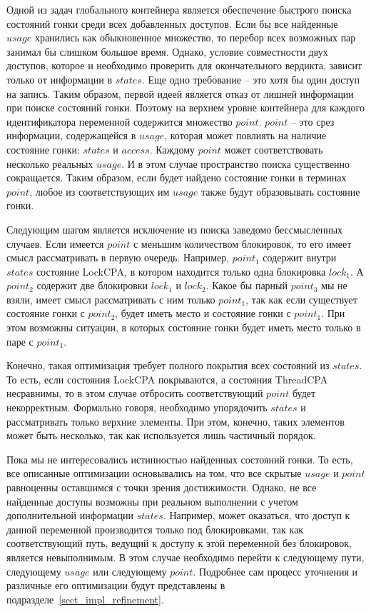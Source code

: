 Одной из задач глобального контейнера является обеспечение быстрого поиска состояний гонки среди всех добавленных доступов.
Если бы все найденные $usage$ хранились как обыкновенное множество, то перебор всех возможных пар занимал бы слишком большое время.
Однако, условие совместности двух доступов, которое и необходимо проверить для окончательного вердикта, зависит только от информации в $states$.
Еще одно требование -- это хотя бы один доступ на запись.
Таким образом, первой идеей является отказ от лишней информации при поиске состояний гонки.
Поэтому на верхнем уровне контейнера для каждого идентификатора переменной содержится множество $point$.
$point$ -- это срез информации, содержащейся в $usage$, которая может повлиять на наличие состояние гонки: $states$ и $access$.
Каждому $point$ может соответствовать несколько реальных $usage$. 
И в этом случае пространство поиска существенно сокращается.
Таким образом, если будет найдено состояние гонки в терминах $point$, любое из соответствующих им $usage$ также будут образовывать состояние гонки.

Следующим шагом является исключение из поиска заведомо бессмысленных случаев.
Если имеется $point$ с меньшим количеством блокировок, то его имеет смысл рассматривать в первую очередь.
Например, $point_1$ содержит внутри $states$ состояние LockCPA, в котором находится только одна блокировка $lock_1$.
А $point_2$ содержит две блокировки $lock_1$ и $lock_2$.
Какое бы парный $point_3$ мы не взяли, имеет смысл рассматривать с ним только $point_1$, так как если существует состояние гонки с $point_2$, будет иметь место и состояние гонки с $point_1$.
При этом возможны ситуации, в которых состояние гонки будет иметь место только в паре с $point_1$.

Конечно, такая оптимизация требует полного покрытия всех состояний из $states$.
То есть, если состояния LockCPA покрываются, а состояния ThreadCPA несравнимы, то в этом случае отбросить соответствующий $point$ будет некорректным.
Формально говоря, необходимо упорядочить $states$ и рассматривать только верхние элементы.
При этом, конечно, таких элементов может быть несколько, так как используется лишь частичный порядок.

Пока мы не интересовались истинностью найденных состояний гонки.
То есть, все описанные оптимизации основывались на том, что все скрытые $usage$ и $point$ равноценны оставшимся с точки зрения достижимости.
Однако, не все найденные доступы возможны при реальном выполнении с учетом дополнительной информации $states$.
Например, может оказаться, что доступ к данной переменной производится только под блокировками, так как соответствующий путь, ведущий к доступу к этой переменной без блокировок, является невыполнимым.
В этом случае необходимо перейти к следующему пути, следующему $usage$ или следующему $point$.
Подробнее сам процесс уточнения и различные его оптимизации будут представлены в подразделе~\ref{sect_impl_refinement}.

